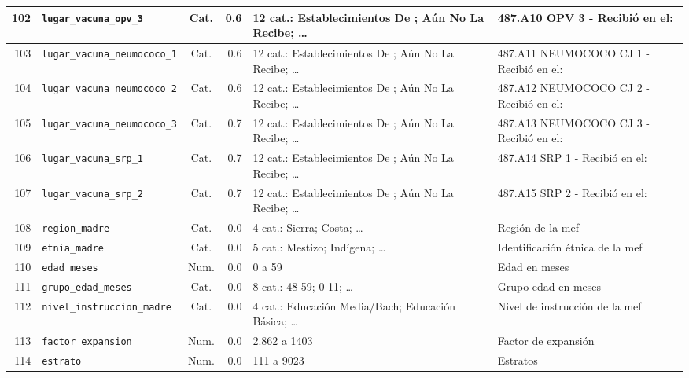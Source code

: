 \begin{longtable}{|r|p{3.1cm}|c|r|p{3.0cm}|p{3.8cm}|}
  102 & \texttt{lugar\_vacuna\_opv\_3} & Cat. & 0.6 & 12 cat.: Establecimientos De ; Aún No La Recibe; … & 487.A10 OPV 3 - Recibió en el: \\ \hline
  103 & \texttt{lugar\_vacuna\_neumococo\_1} & Cat. & 0.6 & 12 cat.: Establecimientos De ; Aún No La Recibe; … & 487.A11 NEUMOCOCO CJ 1 - Recibió en el: \\ \hline
  104 & \texttt{lugar\_vacuna\_neumococo\_2} & Cat. & 0.6 & 12 cat.: Establecimientos De ; Aún No La Recibe; … & 487.A12 NEUMOCOCO CJ 2 - Recibió en el: \\ \hline
  105 & \texttt{lugar\_vacuna\_neumococo\_3} & Cat. & 0.7 & 12 cat.: Establecimientos De ; Aún No La Recibe; … & 487.A13 NEUMOCOCO CJ 3 - Recibió en el: \\ \hline
  106 & \texttt{lugar\_vacuna\_srp\_1} & Cat. & 0.7 & 12 cat.: Establecimientos De ; Aún No La Recibe; … & 487.A14 SRP 1 - Recibió en el: \\ \hline
  107 & \texttt{lugar\_vacuna\_srp\_2} & Cat. & 0.7 & 12 cat.: Establecimientos De ; Aún No La Recibe; … & 487.A15 SRP 2 - Recibió en el: \\ \hline
  108 & \texttt{region\_madre} & Cat. & 0.0 & 4 cat.: Sierra; Costa; … & Región de la mef \\ \hline
  109 & \texttt{etnia\_madre} & Cat. & 0.0 & 5 cat.: Mestizo; Indígena; … & Identificación étnica de la mef \\ \hline
  110 & \texttt{edad\_meses} & Num. & 0.0 & 0 a 59 & Edad en meses \\ \hline
  111 & \texttt{grupo\_edad\_meses} & Cat. & 0.0 & 8 cat.: 48-59; 0-11; … & Grupo edad en meses \\ \hline
  112 & \texttt{nivel\_instruccion\_madre} & Cat. & 0.0 & 4 cat.: Educación Media/Bach; Educación Básica; … & Nivel de instrucción de la mef \\ \hline
  113 & \texttt{factor\_expansion} & Num. & 0.0 & 2.862 a 1403 & Factor de expansión \\ \hline
  114 & \texttt{estrato} & Num. & 0.0 & 111 a 9023 & Estratos \\ \hline
\end{longtable}
\endgroup
